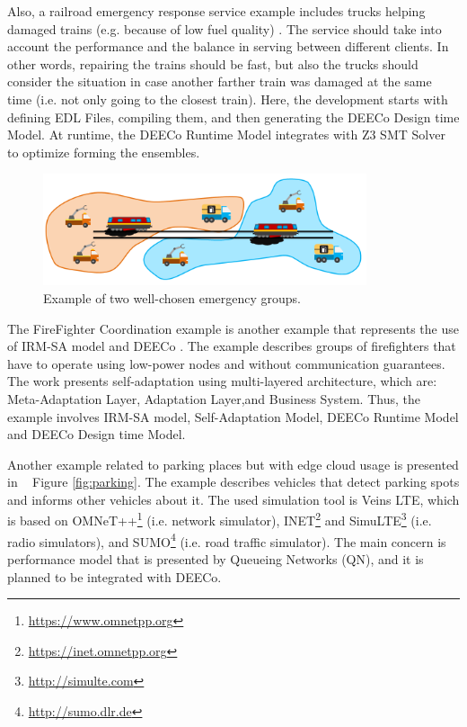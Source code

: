 Also, a railroad emergency response service example includes trucks helping damaged trains (e.g. because of low fuel quality) \cite{modelsward17}. The service should take into account the performance and the balance in serving between different clients. In other words, repairing the trains should be fast, but also the trucks should consider the situation in case another farther train was damaged at the same time (i.e. not only going to the closest train). Here, the development starts with defining EDL Files, compiling them, and then generating the DEECo Design time Model. At runtime, the DEECo Runtime Model integrates with Z3 SMT Solver to optimize forming the ensembles.

\begin{figure}[!htb]
\centering
\includegraphics[scale=0.85]{figures/trains}
\caption{Example of two well-chosen emergency groups.}
\label{fig:trains}
\end{figure}

The FireFighter Coordination example is another example that represents the use of IRM-SA model and DEECo \cite{Gerostathopoulos:2017:SAC:3068423.2823345} \cite{GEROSTATHOPOULOS2016378}. The example describes groups of firefighters that have to operate using low-power nodes and without communication guarantees. The work presents self-adaptation using multi-layered architecture, which are: Meta-Adaptation Layer, Adaptation Layer,and Business System. Thus, the example involves IRM-SA model, Self-Adaptation Model, DEECo Runtime Model and DEECo Design time Model.
 
 Another example related to parking places but with edge cloud usage is presented in ~\cite{Bures:2018:PMS:3185768.3186306} Figure \ref{fig:parking}. The example describes vehicles that detect parking spots and informs other vehicles about it. The used simulation tool is Veins LTE, which is based on OMNeT++\footnote{\url{https://www.omnetpp.org}} (i.e. network simulator), INET\footnote{\url{https://inet.omnetpp.org}} and SimuLTE\footnote{\url{http://simulte.com}} (i.e. radio simulators), and SUMO\footnote{\url{http://sumo.dlr.de}} (i.e. road traffic simulator). The main concern is performance model that is presented by Queueing Networks (QN), and it is planned to be integrated with DEECo. 
 

